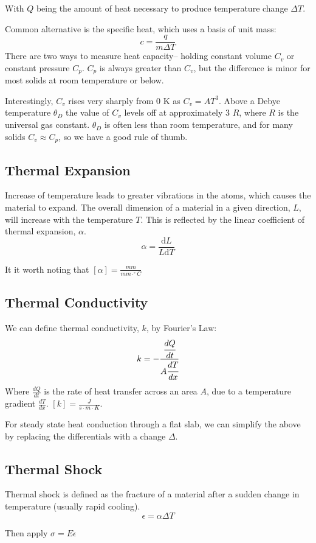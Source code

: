 \documentclass[10pt,letterpaper]{article}
\begin{document}
	With $Q$ being the amount of heat necessary to produce temperature change $\Delta T$.
	
	Common alternative is the specific heat, which uses a basis of unit mass: 
	$$
	c= \frac{q}{m \Delta T}
	$$ 
	There are two ways to measure heat capacity-- holding constant volume $C_v$ or constant pressure $C_p$. $C_p$ is always greater than $C_v$, but the difference is minor for most solids at room temperature or below.  
	
	Interestingly, $C_v$ rises very sharply from 0 K as $C_v = AT^3$.  Above a Debye temperature $\theta_D$ the value of $C_v$ levels off at approximately 3 $R$, where $R$ is the universal gas constant. $\theta_D$ is often less than room temperature, and for many solids $C_v \approx C_p$, so we have a good rule of thumb. 
	\subsection{Thermal Expansion}
	
	Increase of temperature leads to greater vibrations in the atoms, which causes the material to expand. The overall dimension of a material in a given direction, $L$, will increase with the temperature $T$.  This is reflected by the linear coefficient of thermal expansion, $\alpha$. 
	$$
	\alpha = \frac{\text{d}L}{L \text{d} T}
	$$
	
	It it worth noting that $[\alpha] = \frac{mm}{mm \cdot ^{\circ} C}$
	\subsection{Thermal Conductivity}
	We can define thermal conductivity, $k$, by Fourier's Law: 
	$$
	k = - \cfrac{\cfrac{dQ}{dt}}{A\cfrac{dT}{dx}}
	$$
	Where $\frac{dQ}{dt}$ is the rate of heat transfer across an area $A$, due to a temperature gradient $\frac{dT}{dx}$. $[k] = \frac{J}{s \cdot m \cdot K}$. 
	
	For steady state heat conduction through a flat slab, we can simplify the above by replacing the differentials with a change $\Delta$.  
	
	\subsection{Thermal Shock}
	Thermal shock is defined as the fracture of a material after a sudden change in temperature (usually rapid cooling). 
	$$
	\epsilon = \alpha \Delta T
	$$
	
Then apply $\sigma = E\epsilon$
	
\end{document}
